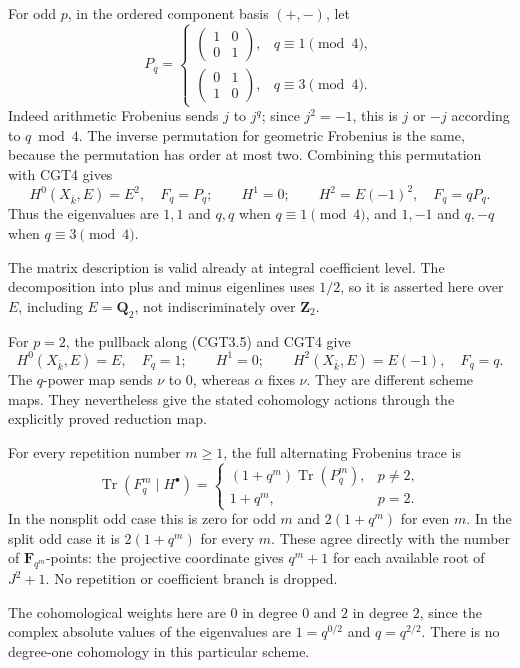 For odd \(p\), in the ordered component basis \((+, -)\), let \[
P_q=\begin{cases}
\begin{pmatrix}1&0\\0&1\end{pmatrix},&q\equiv1\pmod4,\\[2mm]
\begin{pmatrix}0&1\\1&0\end{pmatrix},&q\equiv3\pmod4.
\end{cases}
\tag{CGT5.1}
\] Indeed arithmetic Frobenius sends \(j\) to \(j^q\); since \(j^2=-1\),
this is \(j\) or \(-j\) according to \(q\bmod4\). The inverse
permutation for geometric Frobenius is the same, because the permutation
has order at most two. Combining this permutation with CGT4 gives \[
H^0(X_{\bar k},E)=E^2,\quad F_q=P_q;\qquad
H^1=0;\qquad
H^2=E(-1)^2,\quad F_q=qP_q.
\tag{CGT5.2}
\] Thus the eigenvalues are \(1,1\) and \(q,q\) when \(q\equiv1\pmod4\),
and \(1,-1\) and \(q,-q\) when \(q\equiv3\pmod4\).

The matrix description is valid already at integral coefficient level.
The decomposition into plus and minus eigenlines uses \(1/2\), so it is
asserted here over \(E\), including \(E=\mathbf Q_2\), not
indiscriminately over \(\mathbf Z_2\).

For \(p=2\), the pullback along (CGT3.5) and CGT4 give \[
H^0(X_{\bar k},E)=E,\quad F_q=1;\qquad
H^1=0;\qquad
H^2(X_{\bar k},E)=E(-1),\quad F_q=q.
\tag{CGT5.3}
\] The \(q\)-power map sends \(\nu\) to \(0\), whereas \(\alpha\) fixes
\(\nu\). They are different scheme maps. They nevertheless give the
stated cohomology actions through the explicitly proved reduction map.

For every repetition number \(m\ge1\), the full alternating Frobenius
trace is \[
\operatorname{Tr}(F_q^m\mid H^\bullet)
=\begin{cases}
(1+q^m)\operatorname{Tr}(P_q^m),&p\ne2,\\
1+q^m,&p=2.
\end{cases}
\tag{CGT5.4}
\] In the nonsplit odd case this is zero for odd \(m\) and \(2(1+q^m)\)
for even \(m\). In the split odd case it is \(2(1+q^m)\) for every
\(m\). These agree directly with the number of
\(\mathbf F_{q^m}\)-points: the projective coordinate gives \(q^m+1\)
for each available root of \(J^2+1\). No repetition or coefficient
branch is dropped.

The cohomological weights here are \(0\) in degree \(0\) and \(2\) in
degree \(2\), since the complex absolute values of the eigenvalues are
\(1=q^{0/2}\) and \(q=q^{2/2}\). There is no degree-one cohomology in
this particular scheme.

